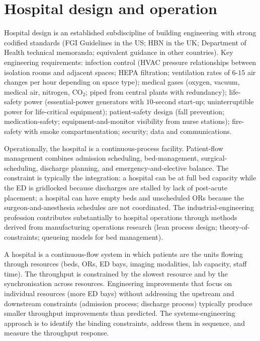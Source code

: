 \section{Hospital design and operation}

Hospital design is an established subdiscipline of building engineering with strong codified standards (FGI Guidelines in the US; HBN in the UK; Department of Health technical memoranda; equivalent guidance in other countries). Key engineering requirements: infection control (HVAC pressure relationships between isolation rooms and adjacent spaces; HEPA filtration; ventilation rates of $6$-$15$ air changes per hour depending on space type); medical gases (oxygen, vacuum, medical air, nitrogen, CO$_2$; piped from central plants with redundancy); life-safety power (essential-power generators with $10$-second start-up; uninterruptible power for life-critical equipment); patient-safety design (fall prevention; medication-safety; equipment-and-monitor visibility from nurse stations); fire-safety with smoke compartmentation; security; data and communications.

Operationally, the hospital is a continuous-process facility. Patient-flow management combines admission scheduling, bed-management, surgical-scheduling, discharge planning, and emergency-and-elective balance. The constraint is typically the integration: a hospital can be at full bed capacity while the ED is gridlocked because discharges are stalled by lack of post-acute placement; a hospital can have empty beds and unscheduled ORs because the surgeon-and-anesthesia schedules are not coordinated. The industrial-engineering profession contributes substantially to hospital operations through methods derived from manufacturing operations research (lean process design; theory-of-constraints; queueing models for bed management).

\begin{principle}
A hospital is a continuous-flow system in which patients are the units flowing through resources (beds, ORs, ED bays, imaging modalities, lab capacity, staff time). The throughput is constrained by the slowest resource and by the synchronisation across resources. Engineering improvements that focus on individual resources (more ED bays) without addressing the upstream and downstream constraints (admission process; discharge process) typically produce smaller throughput improvements than predicted. The systems-engineering approach is to identify the binding constraints, address them in sequence, and measure the throughput response.
\end{principle}

